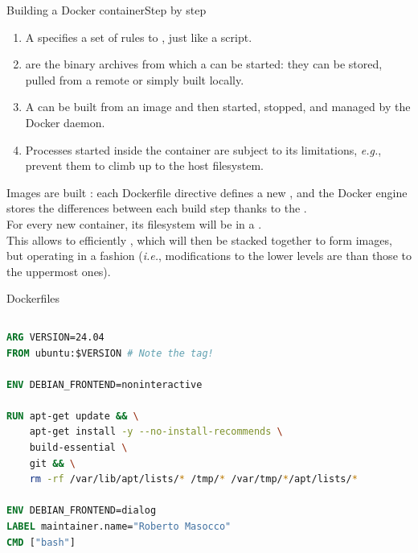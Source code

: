 \begin{frame}{Building a Docker container}{Step by step}
	\begin{enumerate}
		\item A  specifies a set of rules to , just like a script.
		\item {} are the binary archives from which a  can be started: they can be stored, pulled from a remote  or simply built locally.
		\item A  can be built from an image and then started, stopped, and managed by the Docker daemon.
		\item Processes started inside the container are subject to its limitations, \emph{e.g.},  prevent them to climb up to the host filesystem.
	\end{enumerate}
	Images are built : each Dockerfile directive defines a new , and the Docker engine stores the differences between each build step thanks to the .\\
	For every new container, its filesystem will be in a .\\
	This allows to efficiently , which will then be stacked together to form images, but operating in a  fashion (\emph{i.e.}, modifications to the lower levels are  than those to the uppermost ones).
\end{frame}

\begin{frame}[fragile]{Dockerfiles}
	\begin{columns}
		\begin{lstlisting}[language=Dockerfile, caption=Minimal example of a Dockerfile running a Bash shell in a Ubuntu container.]
ARG VERSION=24.04
FROM ubuntu:$VERSION # Note the tag!

ENV DEBIAN_FRONTEND=noninteractive

RUN apt-get update && \
    apt-get install -y --no-install-recommends \
    build-essential \
    git && \
    rm -rf /var/lib/apt/lists/* /tmp/* /var/tmp/*/apt/lists/*

ENV DEBIAN_FRONTEND=dialog
LABEL maintainer.name="Roberto Masocco"
CMD ["bash"]
\end{lstlisting}
	\end{columns}
\end{frame}

